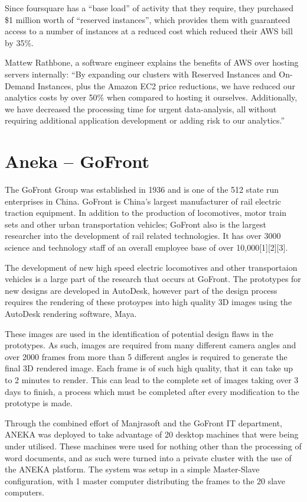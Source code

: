 Since foursquare has a ``base load'' of activity that they require, they purchased \$1 million worth of ``reserved instances'', which provides them with guaranteed access to a number of instances at a reduced cost which reduced their AWS bill by 35\%.  

Mattew Rathbone, a software engineer explains the benefits of AWS over hosting servers internally: ``By expanding our clusters with Reserved Instances and On-Demand Instances, plus the Amazon EC2 price reductions, we have reduced our analytics costs by over 50\% when compared to hosting it ourselves. Additionally, we have decreased the processing time for urgent data-analysis, all without requiring additional application development or adding risk to our analytics.''\ftSAmTwo
\ftSAmTwoText

\section{Aneka -- GoFront}

The GoFront Group was established in 1936 and is one of the 512 state run enterprises in China. 
GoFront is China's largest manufacturer of rail electric traction equipment. In addition to the production of locomotives, motor train sets and other urban transportation vehicles; GoFront also is the largest researcher into the development of rail related technologies. It has over 3000 science and technology staff of an overall employee base of over 10,000[1][2][3]. 

The development of new high speed electric locomotives and other transportaion vehicles is a large part of the research that occurs at GoFront. The prototypes for new designs are developed in AutoDesk, however part of the design process requires the rendering of these protoypes into high quality 3D images using the AutoDesk rendering software, Maya. 

These images are used in the identification of potential design flaws in the prototypes. As such, images are required from many different camera angles and over 2000 frames from more than 5 different angles is required to generate the final 3D rendered image. Each frame is of such high quality, that it can take up to 2 minutes to render. This can lead to the complete set of images taking over 3 days to finish, a process which must be completed after every modification to the prototype is made. 

Through the combined effort of Manjrasoft and the GoFront IT department, ANEKA was deployed to take advantage of 20 desktop machines that were being under utilised. These machines were used for nothing other than the processing of word documents, and as such were turned into a private cluster with the use of the ANEKA platform. The system was setup in a simple Master-Slave configuration, with 1 master computer distributing the frames to the 20 slave computers.

